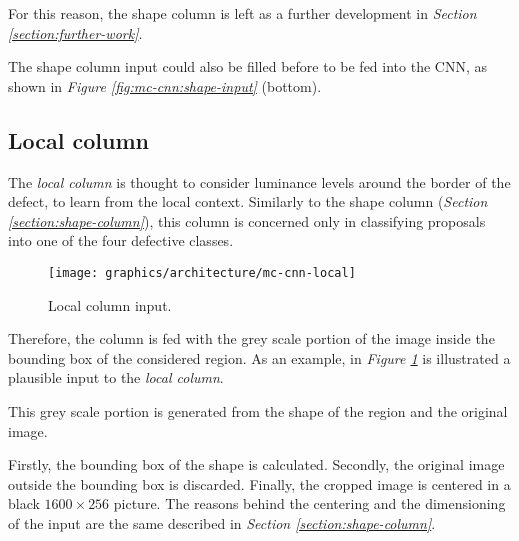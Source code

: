         \par{
            For this reason, the shape column is left as a further development in \emph{Section \ref{section:further-work}}.
        }
        \par{
            The shape column input could also be filled before to be fed into the CNN, as shown in \emph{Figure \ref{fig:mc-cnn:shape-input}} (bottom).
        }
    \subsection{Local column}\label{section:local-column}
        \par{
            The \emph{local column} is thought to consider luminance levels around the border of the defect, to learn from the local context. Similarly to the shape column (\emph{Section \ref{section:shape-column}}), this column is concerned only in classifying proposals into one of the four defective classes.
        }
        \begin{figure}
            \centering
            \texttt{[image: graphics/architecture/mc-cnn-local]}
            \caption{Local column input.}\label{fig:mc-cnn:local-input}
        \end{figure}
        \par{
            Therefore, the column is fed with the grey scale portion of the image inside the bounding box of the considered region. As an example, in \emph{Figure \ref{fig:mc-cnn:local-input}} is illustrated a plausible input to the \emph{local column}.
        }
        \par{
            This grey scale portion is generated from the shape of the region and the original image.
        }
        \par{
            Firstly, the bounding box of the shape is calculated. Secondly, the original image outside the bounding box is discarded. Finally, the cropped image is centered in a black $1600\times 256$ picture. The reasons behind the centering and the dimensioning of the input are the same described in \emph{Section \ref{section:shape-column}}.
        }
